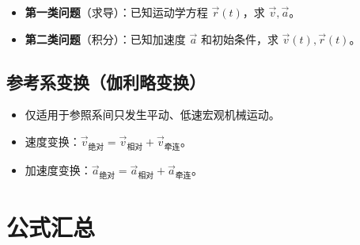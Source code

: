 \documentclass[12pt,a4paper]{ctexart}
\begin{document}
\begin{itemize}
    \item \textbf{第一类问题}（求导）：已知运动学方程 $\vec{r}(t)$，求 $\vec{v}, \vec{a}$。
    \item \textbf{第二类问题}（积分）：已知加速度 $\vec{a}$ 和初始条件，求 $\vec{v}(t), \vec{r}(t)$。
\end{itemize}

\subsection{参考系变换（伽利略变换）}

\begin{itemize}
    \item 仅适用于参照系间只发生平动、低速宏观机械运动。
    \item 速度变换：$\vec{v}_{\text{绝对}} = \vec{v}_{\text{相对}} + \vec{v}_{\text{牵连}}$。
    \item 加速度变换：$\vec{a}_{\text{绝对}} = \vec{a}_{\text{相对}} + \vec{a}_{\text{牵连}}$。
\end{itemize}

\section{公式汇总}
\end{document}

